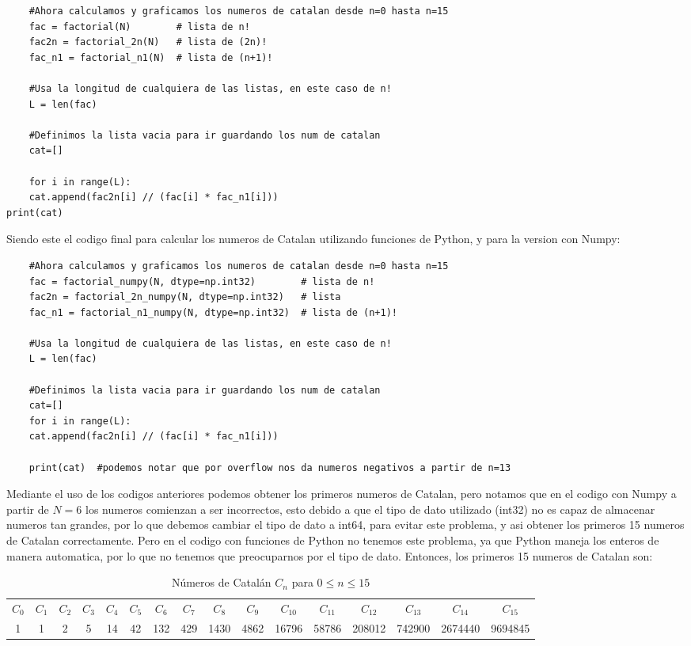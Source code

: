 \documentclass[../portafolio.tex]{subfiles}
\begin{document}
\begin{lstlisting}
    #Ahora calculamos y graficamos los numeros de catalan desde n=0 hasta n=15
    fac = factorial(N)        # lista de n!
    fac2n = factorial_2n(N)   # lista de (2n)!
    fac_n1 = factorial_n1(N)  # lista de (n+1)!

    #Usa la longitud de cualquiera de las listas, en este caso de n!
    L = len(fac)

    #Definimos la lista vacia para ir guardando los num de catalan
    cat=[]

    for i in range(L):
    cat.append(fac2n[i] // (fac[i] * fac_n1[i]))
print(cat)
\end{lstlisting}

Siendo este el codigo final para calcular los numeros de Catalan utilizando funciones de Python, y para la version
con Numpy:

\begin{lstlisting}
    #Ahora calculamos y graficamos los numeros de catalan desde n=0 hasta n=15
    fac = factorial_numpy(N, dtype=np.int32)        # lista de n!
    fac2n = factorial_2n_numpy(N, dtype=np.int32)   # lista
    fac_n1 = factorial_n1_numpy(N, dtype=np.int32)  # lista de (n+1)!

    #Usa la longitud de cualquiera de las listas, en este caso de n!
    L = len(fac)

    #Definimos la lista vacia para ir guardando los num de catalan
    cat=[]
    for i in range(L):
    cat.append(fac2n[i] // (fac[i] * fac_n1[i]))

    print(cat)  #podemos notar que por overflow nos da numeros negativos a partir de n=13
\end{lstlisting}

Mediante el uso de los codigos anteriores podemos obtener los primeros numeros de Catalan, pero notamos que 
en el codigo con Numpy a partir de $N=6$ los numeros comienzan a ser incorrectos, esto debido a que el tipo de dato
utilizado (int32) no es capaz de almacenar numeros tan grandes, por lo que debemos cambiar el tipo de dato a int64, 
para evitar este problema, y asi obtener los primeros 15 numeros de Catalan correctamente.
Pero en el codigo con funciones de Python no tenemos este problema, ya que Python maneja los enteros de manera
automatica, por lo que no tenemos que preocuparnos por el tipo de dato. Entonces, los primeros 15 numeros de Catalan 
son:

\begin{table}[ht]
\centering
\small 
\caption{Números de Catalán $C_n$ para $0\le n \le 15$}
\label{tab:catalan_0_15}
\begin{tabular}{@{}*{16}{c}@{}} 
$C_0$ & $C_1$ & $C_2$ & $C_3$ & $C_4$ & $C_5$ & $C_6$ & $C_7$
 & $C_8$ & $C_9$ & $C_{10}$ & $C_{11}$ & $C_{12}$ & $C_{13}$ & $C_{14}$ & $C_{15}$ \\[4pt]
1 & 1 & 2 & 5 & 14 & 42 & 132 & 429 & 1430 & 4862 & 16796 & 58786 & 208012 & 742900 & 2674440 & 9694845 \\
\end{tabular}
\end{table}
\end{document}
